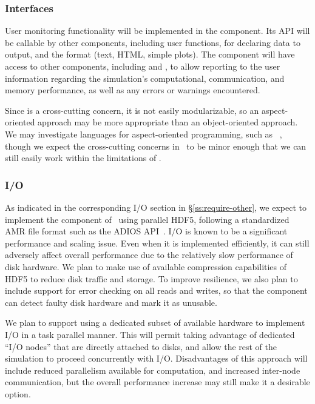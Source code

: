 \documentclass[10pt,twocolumn]{article}
\begin{document}
\subsubsection{Interfaces} \label{sss:design-interfaces}

User monitoring functionality will be implemented in the
 component.  Its API will be callable by other
components, including user functions, for declaring data to output,
and the format (text, HTML, simple plots).  The component will have
access to other components, including  and
, to allow reporting to the user information regarding the
simulation's computational, communication, and memory performance, as
well as any errors or warnings encountered.

Since  is a cross-cutting concern, it is not easily
modularizable, so an aspect-oriented approach may be more appropriate
than an object-oriented approach.  We may investigate languages for
aspect-oriented programming, such as
~\cite{wwwaspectcpp}, though we expect the cross-cutting
concerns in \cello\ to be minor enough that we can still easily work
within the limitations of \cpp.

\subsubsection{I/O} \label{sss:design-io}

As indicated in the corresponding I/O section in
\S\ref{ss:require-other}, we expect to implement the 
component of \cello\ using parallel HDF5, following a standardized AMR
file format such as the ADIOS API~\cite{LoKl08}.  I/O is known to be a
significant performance and scaling issue.  Even when it is
implemented efficiently, it can still adversely affect overall
performance due to the relatively slow performance of disk hardware.
We plan to make use of available compression capabilities of HDF5 to
reduce disk traffic and storage.  To improve resilience, we also plan
to include support for error checking on all reads and writes, so that
the  component can detect faulty disk hardware and mark it
as unusable.

We plan to support using a dedicated subset of available hardware to
implement I/O in a task parallel manner.  This will permit taking
advantage of dedicated ``I/O nodes'' that are directly attached to
disks, and allow the rest of the simulation to proceed concurrently
with I/O.  Disadvantages of this approach will include reduced
parallelism available for computation, and increased inter-node
communication, but the overall performance increase may still make it
a desirable option.
\end{document}
